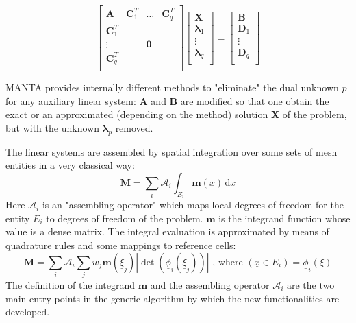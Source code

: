 {
\newcommand{\mmm}[1]{\boldsymbol{#1}}
\renewcommand{\v}[1]{\boldsymbol{#1}}
\renewcommand{\t}[1]{\underline{#1}}
\renewcommand{\d}[1]{\, \mathrm{d}#1}
\begin{equation}
   \begin{bmatrix}
     \mmm{A}&\mmm{C}^T_1&\hdots&\mmm{C}^T_q \\
     \mmm{C}^T_1&&& \\
     \vdots &&\mmm{0}& \\
     \mmm{C}^T_q &&&\\
   \end{bmatrix}
   \begin{bmatrix}
     \v{X} \\
     \v{\lambda}_1  \\
     \vdots\\
     \v{\lambda}_q \\
   \end{bmatrix}
   =
   \begin{bmatrix}
     \v{B} \\
     \v{D}_1  \\
     \vdots\\
     \v{D}_q \\
   \end{bmatrix}
\end{equation}


MANTA provides internally different methods to "eliminate" the dual unknown $p$ for any auxiliary linear system: $\mmm{A}$ and $\mmm{B}$ are modified so that one obtain the exact or an approximated (depending on the method) solution $\v{X}$ of the problem, but with the unknown $\v{\lambda}_p$ removed.

The linear systems are assembled by spatial integration over some sets of mesh entities in a very classical way:
\begin{equation}
  \mmm{M}=\sum_i \mathcal{A}_i \int_{E_i} \mmm{m}(\t{x}) \d{\t{x}}
\end{equation}
Here $\mathcal{A}_i$ is an "assembling operator" which maps local degrees of freedom for the entity $E_i$ to degrees of freedom of the problem. $\mmm{m}$ is the integrand function whose value is a dense matrix. The integral evaluation is approximated by means of quadrature rules and some mappings to reference cells:
\begin{equation}
  \mmm{M}=\sum_i \mathcal{A}_i \sum_{j} w_j \mmm{m}(\t{\xi}_j) |\det(\t{\phi}_i(\t{\xi}_j))| \text{ , where } (\t{x}\in E_i) = \t{\phi}_i(\xi)
\end{equation}
The definition of the integrand $\mmm{m}$ and the assembling operator $\mathcal{A}_i$ are the two main entry points in the generic algorithm by which the new functionalities are developed.

}

